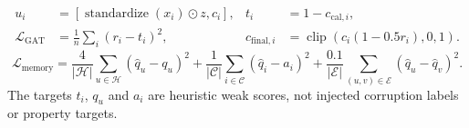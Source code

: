 \begin{align}
u_i&=[\operatorname{standardize}(x_i)\odot z,c_i], & t_i&=1-c_{\mathrm{cal},i},\\
\mathcal L_{\mathrm{GAT}}&=\frac{1}{n}\sum_i(r_i-t_i)^2,
&c_{\mathrm{final},i}&=\operatorname{clip}(c_i(1-0.5r_i),0,1).
\end{align}
\begin{equation}
\mathcal L_{\mathrm{memory}}=
\frac{4}{|\mathcal H|}\sum_{u\in\mathcal H}(\widehat q_u-q_u)^2+
\frac{1}{|\mathcal C|}\sum_{i\in\mathcal C}(\widehat q_i-a_i)^2+
\frac{0.1}{|\mathcal E|}\sum_{(u,v)\in\mathcal E}(\widehat q_u-\widehat q_v)^2.
\end{equation}
The targets $t_i$, $q_u$ and $a_i$ are heuristic weak scores, not injected corruption labels or property targets.
